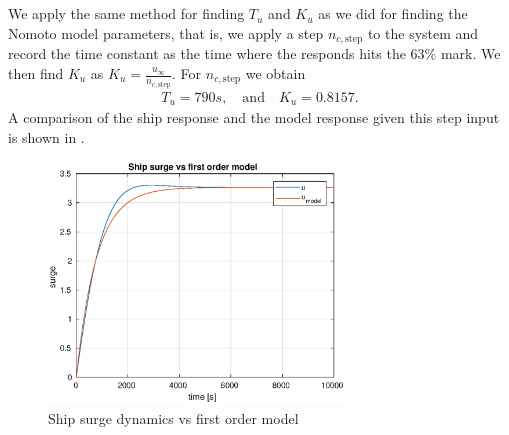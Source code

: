 \subsection{}
We apply the same method for finding $T_u$ and $K_u$ as we did for finding the Nomoto model parameters, that is, we apply a step $n_{c,\text{step}}$ to the system and record the time constant as the time where the responds hits the $63 \%$ mark. We then find $K_u$ as $K_u = \frac{u_{\infty}}{n_{c,\text{step}}}$. For $n_{c,\text{step}}$ we obtain
\begin{equation}\begin{aligned}
T_u = 790s, \quad \text{and} \quad K_u = 0.8157.
\end{aligned}\end{equation}
A comparison of the ship response and the model response given this step input is shown in .
\begin{figure}[H]
\centering
\includegraphics[width=0.7\textwidth]{surge_boi}
\caption{Ship surge dynamics vs first order model}
\label{fig:surge_boi}
\end{figure}

